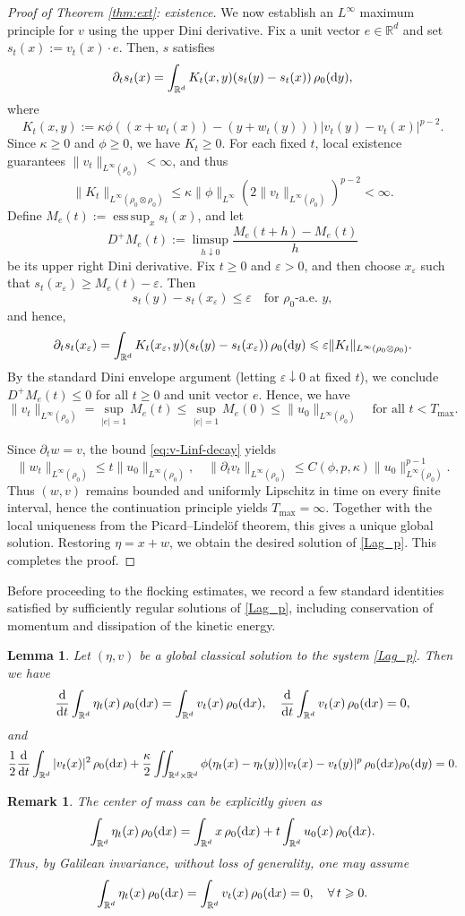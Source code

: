\documentclass[10pt,reqno]{amsart}
\DeclareMathOperator*{\esssup}{ess\,sup}
\renewcommand{\geq}{\geqslant}
\renewcommand{\ge}{\geqslant}
\renewcommand{\le}{\leqslant}
\numberwithin{equation}{section}
\newtheorem{lemma}{Lemma}[section]
\newtheorem{remark}{Remark}[section]
\newcommand{\R}{\mathbb R}
\newcommand{\bq}{\begin{equation}}
\newcommand{\eq}{\end{equation}}
\newcommand{\e}{\varepsilon}
\newcommand{\lt}{\left}
\newcommand{\rt}{\right}
\newcommand{\pa}{\partial}
\newcommand{\intr}{\int_{\R^d}}
\newcommand{\intrr}{\iint_{\R^d \times \R^d}}
\newcommand{\rd}{\textnormal{d}}
\newcommand{\dx}{\textnormal{d}x}
\newcommand{\dt}{\textnormal{d}t}
\newcommand{\dy}{\textnormal{d}y}
\begin{document}
\begin{proof}[Proof of Theorem \ref{thm:ext}: existence]
We now establish an $L^\infty$ maximum principle for $v$ using the upper Dini derivative. Fix a unit vector $e\in\R^d$ and set $s_t(x):=v_t(x)\cdot e$. Then, $s$ satisfies
\[
\pa_t s_t(x) =\intr K_t(x,y) (s_t(y)-s_t(x))\,\rho_0(\dy),
\]
where
\[
K_t(x,y):=\kappa \phi ((x+w_t(x))-(y+w_t(y)))|v_t(y)-v_t(x)|^{p-2}.
\]
Since $\kappa\ge0$ and $\phi\ge0$, we have $K_t\ge0$. For each fixed $t$, local existence guarantees  $\|v_t\|_{L^\infty(\rho_0)}<\infty$, and thus
\[
\|K_t\|_{L^\infty(\rho_0\otimes\rho_0)} \le \kappa \|\phi\|_{L^\infty} \lt(2\|v_t\|_{L^\infty(\rho_0)}\rt)^{p-2}<\infty.
\]
Define $M_e(t):=\esssup_{x}s_t(x)$, and let 
\[
D^+M_e(t):=\limsup_{h\downarrow0}\frac{M_e(t+h)-M_e(t)}{h}
\]
be its upper right Dini derivative. Fix $t\ge0$ and $\varepsilon>0$, and then choose $x_\e$ such that $s_t(x_\e)\ge M_e(t)-\e$. Then 
\[
s_t(y)-s_t(x_\e) \le \e \quad \text{for $\rho_0$-a.e.  $y$}, 
\]
and hence,
\[
\pa_t s_t(x_\e) =\intr K_t(x_\e,y)(s_t(y)-s_t(x_\e))\,\rho_0(\dy) \le \e \|K_t\|_{L^\infty(\rho_0\otimes\rho_0)}.
\]
By the standard Dini envelope argument (letting $\varepsilon\downarrow0$ at fixed $t$), we conclude $D^+M_e(t)\le0$ for all $t\geq 0$ and unit vector $e$.   Hence, we have
\bq\label{eq:v-Linf-decay}
\|v_t\|_{L^\infty(\rho_0)} =\sup_{|e|=1} M_e(t)\le \sup_{|e|=1} M_e(0)\le \|u_0\|_{L^\infty(\rho_0)} \quad\text{for all }t<T_{\max}.
\eq

Since $\pa_t w=v$, the bound \eqref{eq:v-Linf-decay} yields
\[
\|w_t\|_{L^\infty(\rho_0)} \le t \|u_0\|_{L^\infty(\rho_0)}, \quad \|\pa_t v_t\|_{L^\infty(\rho_0)} \le C(\phi,p,\kappa) \|u_0\|_{L^\infty(\rho_0)}^{p-1}.
\]
Thus $(w,v)$ remains bounded and uniformly Lipschitz in time on every finite interval, hence the continuation principle yields $T_{\max}=\infty$. Together with the local uniqueness from the Picard--Lindel\"of theorem, this gives a unique global solution. Restoring $\eta=x+w$, we obtain the desired solution of \eqref{Lag_p}. This completes the proof.
\end{proof}


Before proceeding to the flocking estimates, we record a few standard identities satisfied by sufficiently regular solutions of \eqref{Lag_p}, including conservation of momentum and dissipation of the kinetic energy.

\begin{lemma}\label{lem:apr} Let $(\eta,v)$ be a global classical solution to the system \eqref{Lag_p}. Then we have
\[
\frac{\rd}{\dt} \intr \eta_t(x)\,\rho_0(\dx) = \intr v_t(x)\,\rho_0(\dx), \quad \frac{\rd}{\dt}\intr v_t(x)\,\rho_0(\dx) =0,
\]
and
\[
\frac12 \frac{\rd}{\dt} \intr |v_t(x)|^2\,\rho_0(\dx) + \frac\kappa2\intrr \phi(\eta_t(x)-\eta_t(y))|v_t(x) - v_t(y)|^p \,\rho_0(\dx) \rho_0(\dy) =0.
\]
\end{lemma}
\begin{remark}%
The center of mass can be explicitly given as
\[
 \intr \eta_t(x)\,\rho_0(\dx) =  \intr x\,\rho_0(\dx) + t  \intr u_0(x)\,\rho_0(\dx).
\]
Thus, by Galilean invariance, without loss of generality, one may assume
\[
 \intr \eta_t(x)\,\rho_0(\dx) =  \intr v_t(x)\,\rho_0(\dx) = 0, \quad \forall\, t \geq 0.
\]
\end{remark}
\end{document}
